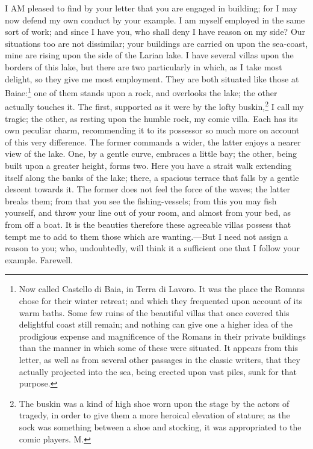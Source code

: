 I AM pleased to find by your letter that you are engaged in building; for
I may now defend my own conduct by your example. I am myself employed in
the same sort of work; and since I have you, who shall deny I have reason
on my side? Our situations too are not dissimilar; your buildings are
carried on upon the sea-coast, mine are rising upon the side of the Larian
lake. I have several villas upon the borders of this lake, but there are
two particularly in which, as I take most delight, so they give me most
employment. They are both situated like those at Baiae:\footnote{Now called Castello di
Baia, in Terra di Lavoro. It was the place the Romans chose for their
winter retreat; and which they frequented upon account of its warm baths.
Some few ruins of the beautiful villas that once covered this delightful
coast still remain; and nothing can give one a higher idea of the
prodigious expense and magnificence of the Romans in their private
buildings than the manner in which some of these were situated. It appears
from this letter, as well as from several other passages in the classic
writers, that they actually projected into the sea, being erected upon
vast piles, sunk for that purpose.}
one of them stands upon a rock, and overlooks the lake; the other actually
touches it. The first, supported as it were by the lofty buskin,\footnote{The buskin was a kind
of high shoe worn upon the stage by the actors of tragedy, in order to
give them a more heroical elevation of stature; as the sock was something
between a shoe and stocking, it was appropriated to the comic players. M.}
I call my tragic; the other, as resting upon the humble rock, my comic
villa. Each has its own peculiar charm, recommending it to its possessor
so much more on account of this very difference. The former commands a
wider, the latter enjoys a nearer view of the lake. One, by a gentle
curve, embraces a little bay; the other, being built upon a greater
height, forms two. Here you have a strait walk extending itself along the
banks of the lake; there, a spacious terrace that falls by a gentle
descent towards it. The former does not feel the force of the waves; the
latter breaks them; from that you see the fishing-vessels; from this you
may fish yourself, and throw your line out of your room, and almost from
your bed, as from off a boat. It is the beauties therefore these agreeable
villas possess that tempt me to add to them those which are wanting.—But
I need not assign a reason to you; who, undoubtedly, will think it a
sufficient one that I follow your example. Farewell.

